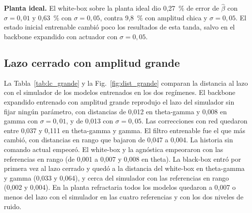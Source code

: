 \documentclass[11pt,a4paper]{article}
\newcommand{\bh}{\hat\beta}
\begin{document}
\textbf{Planta ideal.} El white-box sobre la planta ideal dio 0,27~\% de error de $\bh$ con $\sigma = 0{,}01$ y 0,63~\% con $\sigma = 0{,}05$, contra 9,8~\% con amplitud chica y $\sigma = 0{,}05$. El estado inicial entrenable cambió poco los resultados de esta tanda, salvo en el backbone expandido con actuador con $\sigma = 0{,}05$.

\subsection{Lazo cerrado con amplitud grande}

La Tabla~\ref{tab:lc_grande} y la Fig.~\ref{fig:dist_grande} comparan la distancia al lazo con el simulador de los modelos entrenados en los dos regímenes. El backbone expandido entrenado con amplitud grande reprodujo el lazo del simulador sin fijar ningún parámetro, con distancias de 0,012 en theta-gamma y 0,008 en gamma con $\sigma = 0{,}01$, y de 0,013 con $\sigma = 0{,}05$. Las correcciones con red quedaron entre 0,037 y 0,111 en theta-gamma y gamma. El filtro entrenable fue el que más cambió, con distancias en rango que bajaron de 0,047 a 0,004. La historia sin comando actual empeoró. El white-box y la agnóstica empeoraron con las referencias en rango (de 0,001 a 0,007 y 0,008 en theta). La black-box entró por primera vez al lazo cerrado y quedó a la distancia del white-box en theta-gamma y gamma (0,033 y 0,064), y cerca del simulador con las referencias en rango (0,002 y 0,004). En la planta refractaria todos los modelos quedaron a 0,007 o menos del lazo con el simulador en las cuatro referencias y con los dos niveles de ruido.
\end{document}
